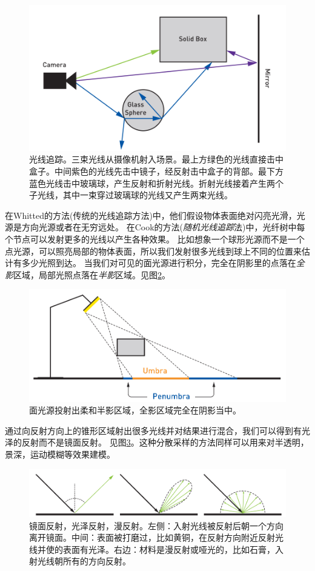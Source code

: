 \documentclass[12pt]{article}
\begin{document}
\begin{figure}
	\centering
	\includegraphics[width=12.0cm]{Fig1-2.png}
	\caption{光线追踪。三束光线从摄像机射入场景。最上方绿色的光线直接击中盒子。中间紫色的光线先击中镜子，经反射击中盒子的背部。最下方蓝色光线击中玻璃球，产生反射和折射光线。折射光线接着产生两个子光线，其中一束穿过玻璃球的光线又产生两束光线。}
	\label{Fig1-2}
\end{figure}

在Whitted的方法(传统的光线追踪方法)中，他们假设物体表面绝对闪亮光滑，光源是方向光源或者在无穷远处。 
在Cook的方法(\textit{随机光线追踪}法)中，光纤树中每个节点可以发射更多的光线以产生各种效果。
比如想象一个球形光源而不是一个点光源，可以照亮局部的物体表面，所以我们发射很多光线到球上不同的位置来估计有多少光照到达。 
当我们对可见的面光源进行积分，完全在阴影里的点落在\textit{全影}区域，局部光照点落在\textit{半影}区域。见图\ref{Fig1-3}。
\begin{figure}
	\centering
	\includegraphics[width=12.0cm]{Fig1-3.png}
	\caption{面光源投射出柔和半影区域，全影区域完全在阴影当中。}
	\label{Fig1-3}
\end{figure}


通过向反射方向上的锥形区域射出很多光线并对结果进行混合，我们可以得到有光泽的反射而不是镜面反射。
见图\ref{Fig1-4}。这种分散采样的方法同样可以用来对半透明，景深，运动模糊等效果建模。
\begin{figure}
	\centering
	\includegraphics[width=12.0cm]{Fig1-4.png}
	\caption{镜面反射，光泽反射，漫反射。左侧：入射光线被反射后朝一个方向离开镜面。中间：表面被打磨过，比如黄铜，在反射方向附近反射光线并使的表面有光泽。右边：材料是漫反射或哑光的，比如石膏，入射光线朝所有的方向反射。}
	\label{Fig1-4}
\end{figure}
\end{document}
